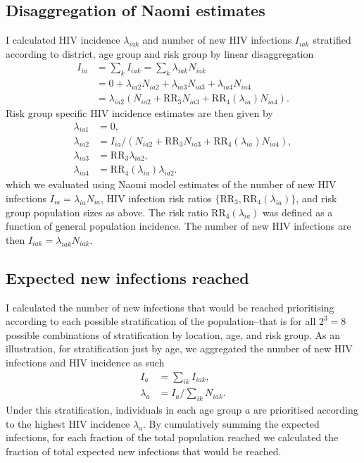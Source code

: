 \documentclass[a4paper, nobind]{templates/ociamthesis}
\begin{document}
\hypertarget{disaggregation-of-naomi-estimates}{%
\subsection{Disaggregation of Naomi estimates}\label{disaggregation-of-naomi-estimates}}

I calculated HIV incidence \(\lambda_{iak}\) and number of new HIV infections \(I_{iak}\) stratified according to district, age group and risk group by linear disaggregation
\begin{align}
    I_{ia} &= \sum_k I_{iak} = \sum_k \lambda_{iak}N_{iak} \\
    &= 0 + \lambda_{ia2} N_{ia2} + \lambda_{ia3} N_{ia3} + \lambda_{ia4} N_{ia4} \\
    &= \lambda_{ia2} \left(N_{ia2}  + \text{RR}_{3} N_{ia3} + \text{RR}_4(\lambda_{ia}) N_{ia4}  \right).
\end{align}
Risk group specific HIV incidence estimates are then given by
\begin{align}
    \lambda_{ia1} &= 0, \\
    \lambda_{ia2} &= I_{ia} / \left(N_{ia2} + \text{RR}_{3} N_{ia3} + \text{RR}_4(\lambda_{ia}) N_{ia4}\right), \\
    \lambda_{ia3} &= \text{RR}_{3} \lambda_{ia2}, \\
    \lambda_{ia4} &= \text{RR}_4(\lambda_{ia}) \lambda_{ia2}.
\end{align}
which we evaluated using Naomi model estimates of the number of new HIV infections \(I_{ia} = \lambda_{ia} N_{ia}\), HIV infection risk ratios \(\{\text{RR}_3, \text{RR}_4(\lambda_{ia})\}\), and risk group population sizes as above.
The risk ratio \(\text{RR}_4(\lambda_{ia})\) was defined as a function of general population incidence.
The number of new HIV infections are then \(I_{iak} = \lambda_{iak} N_{iak}\).

\hypertarget{expected-new-infections-reached}{%
\subsection{Expected new infections reached}\label{expected-new-infections-reached}}

I calculated the number of new infections that would be reached prioritising according to each possible stratification of the population--that is for all \(2^3 = 8\) possible combinations of stratification by location, age, and risk group.
As an illustration, for stratification just by age, we aggregated the number of new HIV infections and HIV incidence as such
\begin{align}
    I_a &= \sum_{ik} I_{iak}, \\
    \lambda_a &= I_a / \sum_{ik} N_{iak}.
\end{align}
Under this stratification, individuals in each age group \(a\) are prioritised according to the highest HIV incidence \(\lambda_a\).
By cumulatively summing the expected infections, for each fraction of the total population reached we calculated the fraction of total expected new infections that would be reached.
\end{document}
